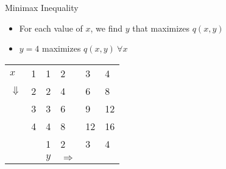 \documentclass[xcolor=table]{beamer}
\begin{document}
    \begin{frame}{Minimax Inequality}
        \begin{itemize}[<+->]
            \item For each value of $x$, we find $y$ that maximizes $q(x, y)$ 
            \item $y=4$ maximizes $q(x, y) ~\forall x$
        \end{itemize}
        
        \begin{table}[]
            \begin{tabular}{llllll}
            \cline{2-2}
            \multicolumn{1}{l|}{$x$}          & \multicolumn{1}{l|}{1} & 1                      & 2                      & 3                      & \cellcolor[HTML]{CBCEFB}4  \\ \cline{2-2}
            \multicolumn{1}{l|}{$\Downarrow$} & \multicolumn{1}{l|}{2} & 2                      & 4                      & 6                      & \cellcolor[HTML]{CBCEFB}8  \\ \cline{2-2}
            \multicolumn{1}{l|}{}             & \multicolumn{1}{l|}{3} & 3                      & 6                      & 9                      & \cellcolor[HTML]{CBCEFB}12 \\ \cline{2-2}
            \multicolumn{1}{l|}{}             & \multicolumn{1}{l|}{4} & 4                      & 8                      & 12                     & \cellcolor[HTML]{CBCEFB}16 \\ \cline{2-6} 
            \multicolumn{1}{l|}{}             & \multicolumn{1}{l|}{}  & \multicolumn{1}{l|}{1} & \multicolumn{1}{l|}{2} & \multicolumn{1}{l|}{3} & \multicolumn{1}{l|}{4}     \\ \cline{2-6} 
                                              &                        & $y$              & $\Rightarrow$           &                        &                           
            \end{tabular}
            \end{table}
    
        \end{frame}
\end{document}
